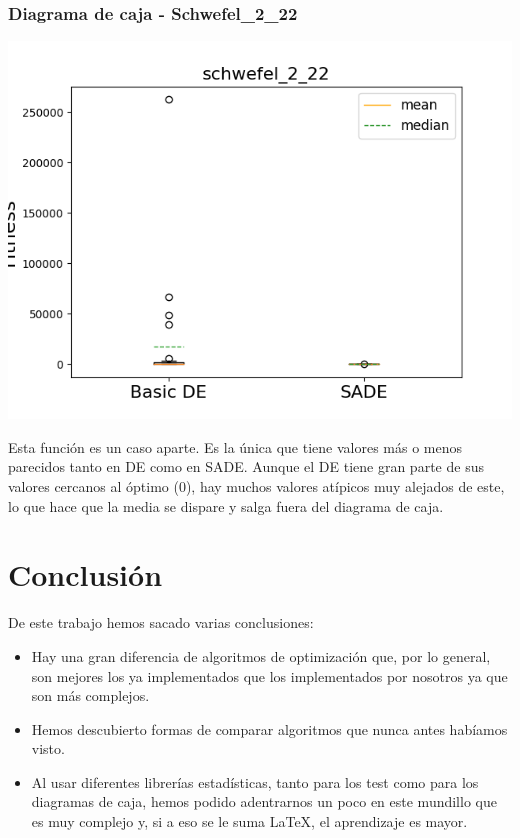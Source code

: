 \documentclass[11pt, a4paper, titlepage]{article}
\begin{document}
\subsubsection{Diagrama de caja - Schwefel\_2\_22}
\begin{center}
\includegraphics[scale=0.85]{schwefel_2_22}
\end{center}
Esta función es un caso aparte. Es la única que tiene valores más o menos parecidos tanto en DE como en SADE. Aunque el DE tiene gran parte de sus valores cercanos al óptimo (0), hay muchos valores atípicos muy alejados de este, lo que hace que la media se dispare y salga fuera del diagrama de caja.
\section{Conclusión}
De este trabajo hemos sacado varias conclusiones:
\begin{itemize}
\item Hay una gran diferencia de algoritmos de optimización que, por lo general, son mejores los ya implementados que los implementados por nosotros ya que son más complejos.
\item Hemos descubierto formas de comparar algoritmos que nunca antes habíamos visto.
\item Al usar diferentes librerías estadísticas, tanto para los test como para los diagramas de caja, hemos podido adentrarnos un poco en este mundillo que es muy complejo y, si a eso se le suma \LaTeX, el aprendizaje es mayor.
\end{itemize}
\end{document}
